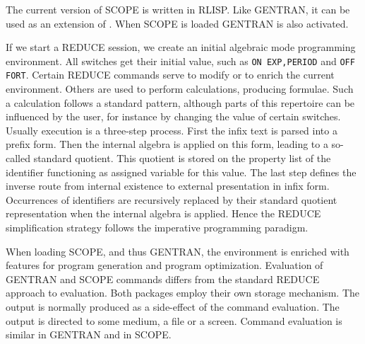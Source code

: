 The current version of SCOPE is written in RLISP.
Like GENTRAN, it can be used as an extension of {\REDUCE}.
When SCOPE is loaded GENTRAN is also activated.

If we start a REDUCE session, we create an initial algebraic mode
programming environment. All switches get their initial value, such as
{\tt ON EXP,PERIOD} and {\tt OFF FORT}.
Certain REDUCE commands serve to modify or to enrich the current environment.
Others are used to perform calculations, producing formulae. Such a
calculation follows a standard pattern, although parts of this repertoire
can be influenced by the user, for instance by changing the value of
certain switches. Usually execution is a three-step process.
First the infix text is parsed into a prefix form.  Then the internal algebra
is applied on this form, leading to a so-called standard quotient.
This quotient is stored on the property list of the identifier
functioning as assigned variable for this value. The last step
defines the inverse route from internal existence to external presentation
in infix form. Occurrences of identifiers are recursively
replaced by their standard quotient representation when the internal algebra
is applied. Hence the REDUCE simplification strategy follows the imperative
programming paradigm.

When loading SCOPE, and thus GENTRAN, the environment is enriched with
features for program generation and program optimization.
Evaluation of GENTRAN and SCOPE commands differs from the standard REDUCE
approach to evaluation. Both packages employ their own storage mechanism.
The output is normally produced as a side-effect of the command evaluation.
The output is directed to some medium, a file or a screen. Command evaluation
is similar in GENTRAN and in SCOPE.

